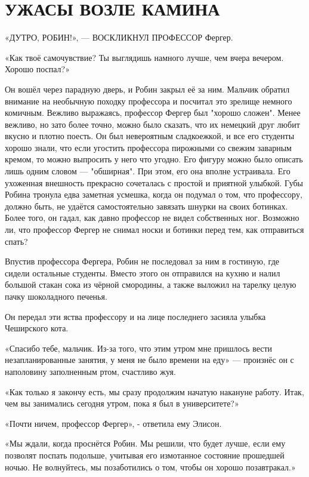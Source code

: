 \documentclass[a4paper,12pt]{book}
\begin{document}
\chapter{УЖАСЫ ВОЗЛЕ КАМИНА}
\noindent\par«Д{ УТРО, РОБИН!», — ВОСКЛИКНУЛ ПРОФЕССОР} Фергер.
\par
«Как твоё самочувствие? Ты выглядишь намного лучше, чем вчера вечером. Хорошо поспал?»
\par
Он вошёл через парадную дверь, и Робин закрыл её за ним. Мальчик обратил внимание на необычную походку профессора и посчитал это зрелище немного комичным. Вежливо выражаясь, профессор Фергер был "хорошо сложен". Менее вежливо, но зато более точно, можно было сказать, что их немецкий друг любит вкусно и плотно поесть. Он был невероятным сладкоежкой, и все его студенты хорошо знали, что если угостить профессора пирожными со свежим заварным кремом, то можно выпросить у него что угодно. Его фигуру можно было описать лишь одним словом — "обширная". При этом, его она вполне устраивала. Его ухоженная внешность прекрасно сочеталась с простой и приятной улыбкой. Губы Робина тронула едва заметная усмешка, когда он подумал о том, что профессору, должно быть, не удаётся самостоятельно завязать шнурки на своих ботинках. Более того, он гадал, как давно профессор не видел собственных ног. Возможно ли, что профессор Фергер не снимал носки и ботинки перед тем, как отправиться спать?\\
\par
Впустив профессора Фергера, Робин не последовал за ним в гостиную, где сидели остальные студенты. Вместо этого он отправился на кухню и налил большой стакан сока из чёрной смородины, а также выложил на тарелку целую пачку шоколадного печенья.
\par
Он передал эти яства профессору и на лице последнего засияла улыбка Чеширского кота.
\par
«Спасибо тебе, мальчик. Из-за того, что этим утром мне пришлось вести незапланированные занятия, у меня не было времени на еду» — произнёс он с наполовину заполненным ртом, счастливо жуя.
\par
«Как только я закончу есть, мы сразу продолжим начатую накануне работу. Итак, чем вы занимались сегодня утром, пока я был в университете?»
\par
«Почти ничем, профессор Фергер», - ответила ему Элисон.
\par
«Мы ждали, когда проснётся Робин. Мы решили, что будет лучше, если ему позволят поспать подольше, учитывая его измотанное состояние прошедшей ночью. Не волнуйтесь, мы позаботились о том, чтобы он хорошо позавтракал.»
\end{document}

